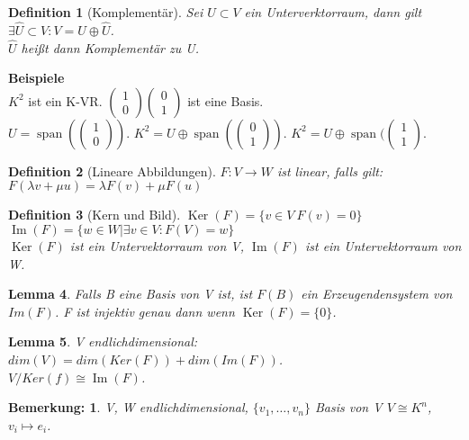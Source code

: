 \documentclass{report}
\newcommand{\lb}{\lambda}
\newcommand{\ve}[1]{{\begin{pmatrix}#1 \end{pmatrix}}}
\renewcommand{\v}{\ve}
\DeclareMathOperator{\Span}{span}
\DeclareMathOperator{\Ima}{Im}
\DeclareMathOperator{\Ker}{Ker}
\theoremstyle{customrem}
\newtheorem*{bemerkung}{Bemerkung\textnormal:}
\theoremstyle{customdef}
\newtheorem{definition}{Definition}[chapter]
\newtheorem{lemma}[definition]{Lemma}
\theoremstyle{customenv}
\begin{document}
\begin{definition}[Komplement\"ar]
  Sei \(U \subset V\) ein Unterverktorraum, dann gilt
  \(\exists \hat{U} \subset V : V = U \oplus \hat{U}\).\\
  \(\hat{U}\) hei\ss{}t dann Komplement\"ar zu U.
\end{definition}

\textbf{Beispiele}\\
\(K^2\) ist ein K-VR. \(\v{1\\0} \v{0\\1}\) ist eine Basis.\\
\(U = \Span(\v{1\\0})\). \(K^2 = U \oplus \Span(\v{0\\1})\).
\(K^2 = U \oplus \Span(\v{1 \\1}\).

\begin{definition}[Lineare Abbildungen]
  \(F : V \to W\) ist linear, falls gilt:
  \(F(\lb v + \mu u) = \lb F(v) + \mu F(u)\)
\end{definition}

\begin{definition}[Kern und Bild]
  \(\Ker(F) = \{v \in V \ F(v) = 0\}\)\\
  \(\Ima(F) = \{w \in W| \exists v \in V : F(V) = w\}\)\\
  \(\Ker(F)\) ist ein Untervektorraum von V, \(\Ima(F)\) ist ein Untervektorraum
  von W.
\end{definition}

\begin{lemma}
  Falls B eine Basis von V ist, ist \(F(B)\) ein Erzeugendensystem
   von \(Im(F)\).
  F ist injektiv genau dann wenn \(\Ker(F) = \{0\}\).
\end{lemma}

\begin{lemma}
  V endlichdimensional: \(dim(V) = dim(Ker(F)) + dim(Im(F))\).\\
  \(V / Ker(f) \cong \Ima(F)\).
\end{lemma}

\begin{bemerkung}
  V, W endlichdimensional, \(\{v_1, \dots, v_n\}\) Basis von V \(V \cong K^n\),
  \(v_i \mapsto e_i\).
\end{bemerkung}
\end{document}
